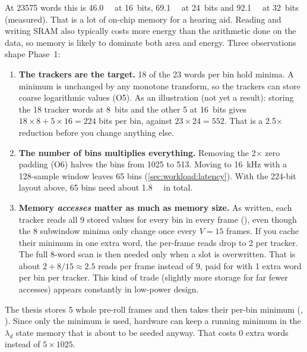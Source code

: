 At \num{23575} words this is \qty{46.0}{\kibi\byte} at 16~bits,
\qty{69.1}{\kibi\byte} at 24~bits and \qty{92.1}{\kibi\byte} at 32~bits (measured).
That is a lot of on-chip memory for a hearing aid. Reading and writing SRAM also
typically costs more energy than the arithmetic done on the data, so memory is
likely to dominate both area and energy. Three observations shape Phase~1:

\begin{enumerate}
  \item \textbf{The trackers are the target.} 18 of the 23 words per bin hold
  minima. A minimum is unchanged by any monotone transform, so the trackers can
  store coarse logarithmic values (O5). As an illustration (not yet a result):
  storing the 18 tracker words at 8~bits and the other 5 at 16~bits gives
  $18\times8+5\times16=224$ bits per bin, against $23\times24=552$. That is a
  2.5$\times$ reduction before you change anything else.
  \item \textbf{The number of bins multiplies everything.} Removing the 2$\times$
  zero padding (O6) halves the bins from 1025 to 513. Moving to \qty{16}{\kHz}
  with a 128-sample window leaves 65 bins (\cref{sec:workload:latency}). With
  the 224-bit layout above, 65 bins need about \qty{1.8}{\kibi\byte} in total.
  \item \textbf{Memory \emph{accesses} matter as much as memory size.} As
  written, each tracker reads all 9 stored values for every bin in every frame
  (), even though the 8 subwindow minima only change once every
  $V=15$ frames. If you cache their minimum in one extra word, the per-frame
  reads drop to 2 per tracker. The full 8-word scan is then needed only when a
  slot is overwritten. That is about $2+8/15\approx2.5$ reads per frame instead
  of 9, paid for with 1 extra word per bin per tracker. This kind of trade
  (slightly more storage for far fewer accesses) appears constantly in low-power
  design.
\end{enumerate}

\begin{tipbox}
The thesis stores 5 whole pre-roll frames and then takes their per-bin minimum
(, ). Since only the minimum is used, hardware can keep
a running minimum in the $\lambda_d$ state memory that is about to be seeded
anyway. That costs 0 extra words instead of $5\times1025$.
\end{tipbox}

